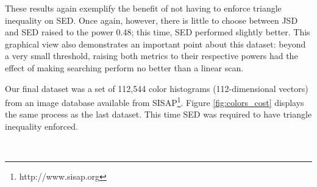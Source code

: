 These results again exemplify the benefit of not having to enforce triangle inequality on SED.  Once again, however, there is little to choose between JSD and SED raised to the power 0.48; this time, SED performed slightly better.  This graphical view also demonstrates an important point about this dataset: beyond a very small threshold, raising both metrics to their respective powers had the effect of making searching perform no better than a linear scan. 

Our final dataset was a set of 112,544 color histograms (112-dimensional vectors) from an image database available from SISAP\footnote{http://www.sisap.org}.  Figure \ref{fig:colors_cost} displays the same process as the last dataset.  This time SED was required to have triangle inequality enforced.
\begin{figure}
        \centering
        ~ 
        

\end{figure}
